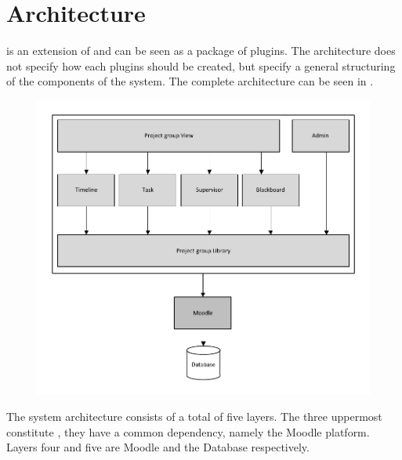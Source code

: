 \section{Architecture}
\system{} is an extension of \moodle{} and can be seen as a package of plugins. 
The architecture does not specify how each plugins should be created, but specify a general structuring of the components of the system. 
The complete architecture can be seen in .
\begin{figure}
	\centering
		\includegraphics{images/architecture.pdf}
	\label{fig:architecture}
\end{figure}

The system architecture consists of a total of five layers. 
The three uppermost constitute \system{}, they have a common dependency, namely the Moodle platform. 
Layers four and five are Moodle and the Database respectively.

